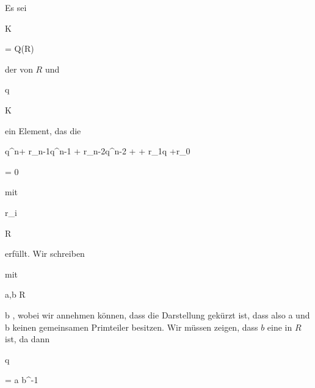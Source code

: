 {


Es sei


\mavergleichskette

{\vergleichskette

{K
}

{ = }{ Q(R)
}

{  }{
}

{    }{
}

{   }{
}

}
{}{}{}
der
von $R$ und


\mavergleichskette

{\vergleichskette

{q
}

{ \in }{ K
}

{  }{
}

{    }{
}

{   }{
}

}
{}{}{}
ein Element, das die


\mavergleichskettedisp

{\vergleichskette

{ q^n+ r_{n-1}q^{n-1} + r_{n-2}q^{n-2} + \cdots + r_1q +r_0
}

{ =} { 0
}

{ } {
}

{ } {
}

{ } {
}

}
{}{}{}
mit


\mavergleichskette

{\vergleichskette

{r_i
}

{ \in }{ R
}

{  }{
}

{    }{
}

{   }{
}

}
{}{}{}
erfüllt. Wir schreiben


 {mit}

 {a,b \in R} {}

 {b } {} {} {,}
wobei wir annehmen können, dass die Darstellung gekürzt ist, dass also
\mathkor {} {a} {und} {b} {}
keinen gemeinsamen Primteiler besitzen. Wir müssen zeigen, dass $b$ eine
in $R$ ist, da dann


\mavergleichskette

{\vergleichskette

{ q
}

{ = }{ a b^{-1}
}

}}
